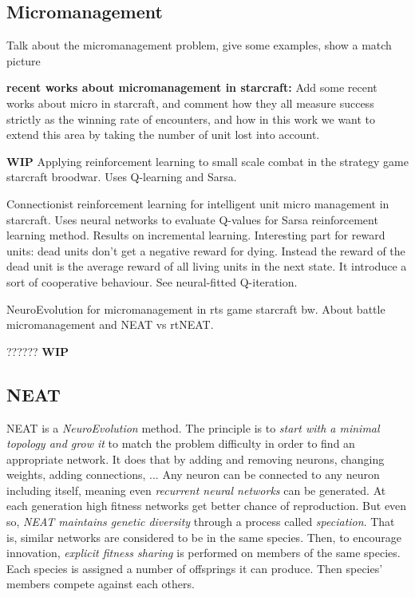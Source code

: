 \subsection{Micromanagement}

Talk about the micromanagement problem, give some examples, show a
match picture

{\bf recent works about micromanagement in starcraft:} Add some recent
works about micro in starcraft, and comment how they all measure
success strictly as the winning rate of encounters, and how in this
work we want to extend this area by taking the number of unit lost
into account.

{\bf WIP}
Applying reinforcement learning to small scale combat in the strategy
game starcraft broodwar. Uses Q-learning and Sarsa. \cite{WeWa12}

Connectionist reinforcement learning for intelligent unit micro
management in starcraft.  Uses neural networks to evaluate Q-values
for Sarsa reinforcement learning method. Results on incremental
learning.  Interesting part for reward units: dead units don’t get a
negative reward for dying.  Instead the reward of the dead unit is the
average reward of all living units in the next state.  It introduce a
sort of cooperative behaviour. See neural-fitted Q-iteration. \cite{ShBeWi11}

NeuroEvolution for micromanagement in rts game starcraft bw. About
battle micromanagement and NEAT vs rtNEAT. \cite{ShWa13}

???\citet{SiSuBa14}???
{\bf WIP}

\subsection{NEAT}\label{subsec:neat}

NEAT is a \emph{NeuroEvolution} method. The principle is to
\emph{start with a minimal topology and grow it} to match the problem
difficulty in order to find an appropriate network.  It does that by
adding and removing neurons, changing weights, adding connections, ...
Any neuron can be connected to any neuron including itself, meaning
even \emph{recurrent neural networks} can be generated.  At each
generation high fitness networks get better chance of
reproduction. But even so, \emph{NEAT maintains genetic diversity}
through a process called \emph{speciation}. That is, similar networks
are considered to be in the same species. Then, to encourage
innovation, \emph{explicit fitness sharing} is performed on members of
the same species. Each species is assigned a number of offsprings it
can produce. Then species' members compete against each
others. \cite{StMi02}

